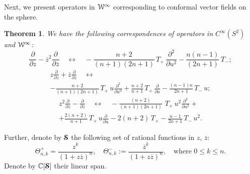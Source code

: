 \documentclass[10pt,a4paper]{amsart}
\newcounter{sec}
\newtheorem{theorem}{Theorem}[sec]
\renewcommand\O{\mathrm{O}}
\def\le{\leqslant}
\def\cS{\boldsymbol{\EuScript S}}
\def\cW{\EuScript W}
\def\R {{\mathbb R }}
\def\C {{\mathbb C }}
\def\ov{\overline}
\def\sm{\smallskip}
\begin{document}
  
Next, we present operators in $\cW^\infty$ corresponding
to conformal vector fields on the sphere.    


\begin{theorem}
\label{th:2}
We have the following correspondences of operators
in $C^\infty(S^2)$ and $\cW^\infty$:
\begin{equation}
\frac{\partial}{\partial z}- \ov z^2\frac{\partial}{\partial \ov z}
\quad\longleftrightarrow\quad 
-\frac{n + 2}{(n+1)(2 n+1)}\,
T_+ \,\frac{\partial^2}{\partial u^2}  - 
 \frac{n (n -  1)}{(2 n+1)}\, T_-  ;
\label{eq:conf1}
\end{equation}
\begin{multline}
z\frac{\partial}{\partial z}+ \ov z\frac{\partial}{\partial \ov z}
\quad\longleftrightarrow\quad 
\\ - \frac{n+2}{(n+1) (2 n+1)}\,
 T_+\, u \frac{\partial^2}{\partial u^2}+ 
 \frac{n+2}{n+1}\, T_+ \,  \frac{\partial}{\partial u}
 -\frac{(n-1) n}{2 n+1}\, T_- \,u ;
\label{eq:conf2}
\end{multline}
\begin{multline}
z^2\frac{\partial}{\partial z}- \frac{\partial}{\partial \ov z}
\quad\longleftrightarrow\quad 
-\frac{(n+2) }{(n+1) (2 n+1)}\,\, T_+ \, u^2\frac{\partial^2}{\partial u^2}
+\\+
\frac{2 (n+2)}{n+1}\, T_+ \,u  \frac{\partial}{\partial u}
-
2 (n+2)\, T_+
-\frac{n-1}{2 n+1} \,T_-\, u^2.
\label{eq:conf3}
\end{multline}
\end{theorem}


\medskip

Further, denote by $\cS$
the following set of rational functions in $z$, $\ov z$:
\begin{equation}
\Theta^+_{n,k}=\frac{z^k}{(1+z\ov z)^n},\quad \Theta^-_{n,k}:=\frac{\ov z^k}{(1+z\ov z)^n},
\quad\text{where $0\le k\le n$.}
\end{equation}
Denote by $\C[\cS]$ their linear span.

\sm
\end{document}
